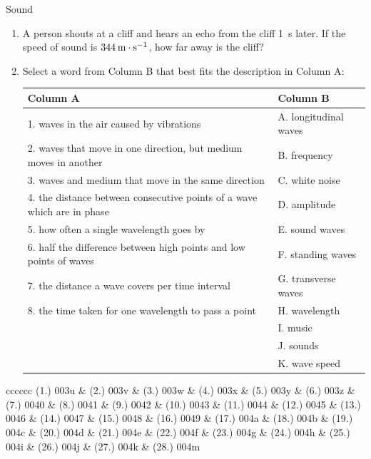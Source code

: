 \begin{eocexercises}{Sound}
\begin{enumerate}[noitemsep, label=\textbf{\arabic*}. ]
\label{m38783*uid44}\item A person shouts at a cliff and hears an echo from the cliff 1~s later. If the speed of sound is $344\phantom{\rule{2pt}{0ex}}\text{m}\ensuremath{\cdot}\text{s}{}^{-1}$, how far away is the cliff?\newline
\label{m38783*uid37}\item Select a word from Column B that best fits the description in Column A:
          \begin{center}
\begin{tabular}{ll}
\textbf{Column A} & \textbf{Column B} \\ \hline
1. waves in the air caused by vibrations & A. longitudinal waves \\
2. waves that move in one direction, but medium moves in another & B. frequency \\
3. waves and medium that move in the same direction & C. white noise \\
4. the distance between consecutive points of a wave which are in phase & D. amplitude \\
5. how often a single wavelength goes by & E. sound waves \\
6. half the difference between high points and low points of waves & F. standing waves \\
7. the distance a wave covers per time interval & G. transverse waves \\
8. the time taken for one wavelength to pass a point & H. wavelength \\
& I. music \\
& J. sounds \\
& K. wave speed \\
\end{tabular}
\end{center}
\end{enumerate}
  \label{m38800**end}
  \label{9b5d72dd5f0585e544578ab90a9956a8**end}
\par \practiceinfo
 \par \begin{tabular}[h]{cccccc}
 (1.) 003u  &  (2.) 003v  &  (3.) 003w  &  (4.) 003x  &  (5.) 003y  &  (6.) 003z  &  (7.) 0040  &  (8.) 0041  &  (9.) 0042  &  (10.) 0043  &  (11.) 0044  &  (12.) 0045  &  (13.) 0046  &  (14.) 0047  &  (15.) 0048  &  (16.) 0049  &  (17.) 004a  &  (18.) 004b  &  (19.) 004c  &  (20.) 004d  &  (21.) 004e  &  (22.) 004f  &  (23.) 004g  &  (24.) 004h  &  (25.) 004i  &  (26.) 004j  & (27.) 004k & (28.) 004m  \end{tabular}

\end{eocexercises}
